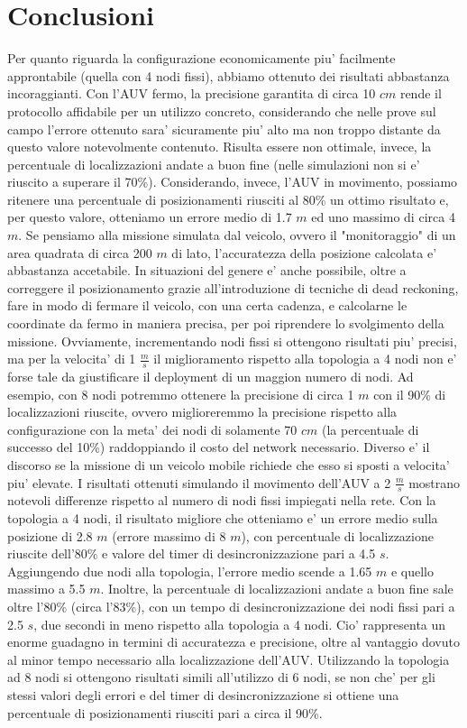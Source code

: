 \section{Conclusioni}
Per quanto riguarda la configurazione economicamente piu' facilmente approntabile (quella con 4 nodi fissi), abbiamo ottenuto dei risultati abbastanza incoraggianti. Con l'AUV fermo, la precisione garantita di circa 10 $cm$ rende il protocollo  affidabile per un utilizzo concreto, considerando che nelle prove sul campo l'errore ottenuto sara' sicuramente piu' alto ma non troppo distante da questo valore notevolmente contenuto.
Risulta essere non ottimale, invece, la percentuale di localizzazioni andate a buon fine (nelle simulazioni non si e' riuscito a superare il  70\%). Considerando, invece, l'AUV in movimento, possiamo ritenere una percentuale di posizionamenti riusciti al 80\% un ottimo risultato e, per questo valore, otteniamo un errore medio di 1.7 $m$ ed uno massimo di circa 4 $m$. Se pensiamo alla missione simulata dal veicolo, ovvero il "monitoraggio" di un area quadrata di circa 200 $m$ di lato, l'accuratezza della posizione calcolata e' abbastanza accetabile. In situazioni del genere e' anche possibile, oltre a correggere il posizionamento grazie all'introduzione di tecniche di dead reckoning, fare in modo di fermare il veicolo, con una certa cadenza, e calcolarne le coordinate da fermo in maniera precisa, per poi riprendere lo svolgimento della missione.
\newline
Ovviamente, incrementando nodi fissi si ottengono risultati piu' precisi, ma per la velocita' di 1 $\frac{m}{s}$ il miglioramento rispetto alla topologia a 4 nodi non e' forse tale da giustificare il deployment di un maggion numero di nodi.
Ad esempio, con 8 nodi potremmo ottenere la precisione di circa 1 $m$ con il 90\% di localizzazioni riuscite, ovvero miglioreremmo la precisione rispetto alla configurazione con la meta' dei nodi di solamente 70 $cm$ (la percentuale di successo del 10\%) raddoppiando il costo del network necessario.
Diverso e' il discorso se la missione di un veicolo mobile richiede che esso si sposti a velocita' piu' elevate. I risultati ottenuti simulando il movimento dell'AUV a 2 $\frac{m}{s}$ mostrano notevoli differenze rispetto al numero di nodi fissi impiegati nella rete.
Con la topologia a 4 nodi, il risultato migliore che otteniamo e' un errore medio sulla posizione di 2.8 $m$ (errore massimo di 8 $m$), con percentuale di localizzazione riuscite dell'80\% e valore del timer di desincronizzazione pari a 4.5 $s$.
Aggiungendo due nodi alla topologia, l'errore medio scende a 1.65 $m$ e quello massimo a 5.5 $m$. Inoltre, la percentuale di localizzazioni andate a buon fine sale oltre l'80\% (circa l'83\%), con un tempo di desincronizzazione dei nodi fissi pari a 2.5 $s$, due secondi in meno rispetto alla topologia a 4 nodi. Cio' rappresenta un enorme guadagno in termini di accuratezza e precisione, oltre al vantaggio dovuto al minor tempo necessario alla localizzazione dell'AUV.
Utilizzando la topologia ad 8 nodi si ottengono risultati simili all'utilizzo di 6 nodi, se non che' per gli stessi valori degli errori e del timer di desincronizzazione si ottiene una percentuale di posizionamenti riusciti pari a circa il 90\%.









